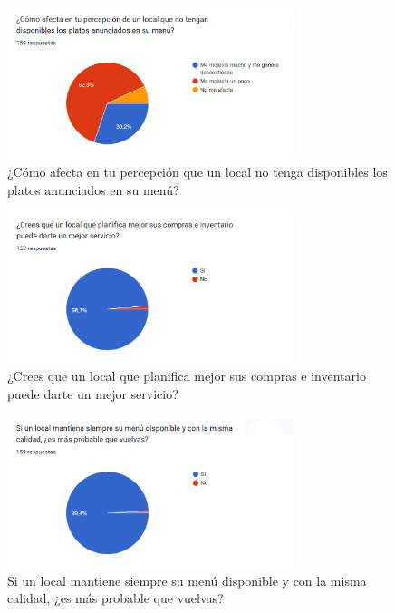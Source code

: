 \begin{figure}[!htbp]
  \centering
  \includegraphics[width=0.75\textwidth]{images/pregunta4.png}
  \caption{¿Cómo afecta en tu percepción que un local no tenga disponibles los platos anunciados en su menú?}
  \label{fig:anexo-p4}
\end{figure}

\begin{figure}[!htbp]
  \centering
  \includegraphics[width=0.75\textwidth]{images/pregunta5.png}
  \caption{¿Crees que un local que planifica mejor sus compras e inventario puede darte un mejor servicio?}
  \label{fig:anexo-p5}
\end{figure}

\begin{figure}[!htbp]
  \centering
  \includegraphics[width=0.75\textwidth]{images/pregunta6.png}
  \caption{Si un local mantiene siempre su menú disponible y con la misma calidad, ¿es más probable que vuelvas?}
  \label{fig:anexo-p6}
\end{figure}

